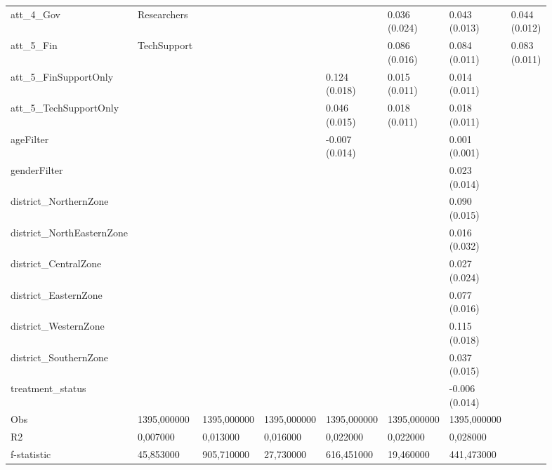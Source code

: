 \begin{tabular}{lllllll}
att_4_Gov&Researchers &   &   &   & \makecell{ 0.036 \\ (0.024) } & \makecell{ 0.043 \\ (0.013) } & \makecell{ 0.044 \\ (0.012) } \\
att_5_Fin&TechSupport &   &   &   & \makecell{ 0.086 \\ (0.016) } & \makecell{ 0.084 \\ (0.011) } & \makecell{ 0.083 \\ (0.011) } \\
att_5_FinSupportOnly &   &   &   & \makecell{ 0.124 \\ (0.018) } & \makecell{ 0.015 \\ (0.011) } & \makecell{ 0.014 \\ (0.011) } \\
att_5_TechSupportOnly &   &   &   & \makecell{ 0.046 \\ (0.015) } & \makecell{ 0.018 \\ (0.011) } & \makecell{ 0.018 \\ (0.011) } \\
ageFilter &   &   &   & \makecell{ -0.007 \\ (0.014) } &   & \makecell{ 0.001 \\ (0.001) } \\
genderFilter &   &   &   &   &   & \makecell{ 0.023 \\ (0.014) } \\
district_NorthernZone &   &   &   &   &   & \makecell{ 0.090 \\ (0.015) } \\
district_NorthEasternZone &   &   &   &   &   & \makecell{ 0.016 \\ (0.032) } \\
district_CentralZone &   &   &   &   &   & \makecell{ 0.027 \\ (0.024) } \\
district_EasternZone &   &   &   &   &   & \makecell{ 0.077 \\ (0.016) } \\
district_WesternZone &   &   &   &   &   & \makecell{ 0.115 \\ (0.018) } \\
district_SouthernZone &   &   &   &   &   & \makecell{ 0.037 \\ (0.015) } \\
treatment_status &   &   &   &   &   & \makecell{ -0.006 \\ (0.014) } \\
Obs & 1395,000000 & 1395,000000 & 1395,000000 & 1395,000000 & 1395,000000 & 1395,000000 \\
R2 & 0,007000 & 0,013000 & 0,016000 & 0,022000 & 0,022000 & 0,028000 \\
f-statistic & 45,853000 & 905,710000 & 27,730000 & 616,451000 & 19,460000 & 441,473000 \\
\bottomrule
\end{tabular}
